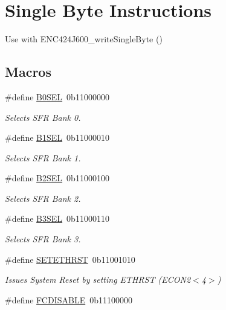 \hypertarget{group__single__byte}{}\section{Single Byte Instructions}
\label{group__single__byte}


Use with E\+N\+C424\+J600\+\_\+write\+Single\+Byte ()  


\subsection*{Macros}
\begin{DoxyCompactItemize}
\item 
\#define \mbox{\hyperlink{group__single__byte_ga6239793585f937e37e61eda071508b40}{B0\+S\+EL}}~0b11000000
\begin{DoxyCompactList}\small\item\em Selects S\+FR Bank 0. \end{DoxyCompactList}\item 
\#define \mbox{\hyperlink{group__single__byte_gab360ee4ad696c1bdd05618a6fb93747b}{B1\+S\+EL}}~0b11000010
\begin{DoxyCompactList}\small\item\em Selects S\+FR Bank 1. \end{DoxyCompactList}\item 
\#define \mbox{\hyperlink{group__single__byte_ga0c5d34eed61b9f41eb229d1296553fa3}{B2\+S\+EL}}~0b11000100
\begin{DoxyCompactList}\small\item\em Selects S\+FR Bank 2. \end{DoxyCompactList}\item 
\#define \mbox{\hyperlink{group__single__byte_ga3f5b541c613dad477a8d90e10a7b8a55}{B3\+S\+EL}}~0b11000110
\begin{DoxyCompactList}\small\item\em Selects S\+FR Bank 3. \end{DoxyCompactList}\item 
\#define \mbox{\hyperlink{group__single__byte_ga8763648ea939c9f6494cca43828dcc0c}{S\+E\+T\+E\+T\+H\+R\+ST}}~0b11001010
\begin{DoxyCompactList}\small\item\em Issues System Reset by setting E\+T\+H\+R\+ST (E\+C\+O\+N2$<$4$>$) \end{DoxyCompactList}\item 
\#define \mbox{\hyperlink{group__single__byte_ga1acab7510b4236c7e4376439a8ffe154}{F\+C\+D\+I\+S\+A\+B\+LE}}~0b11100000

\end{DoxyCompactItemize}
